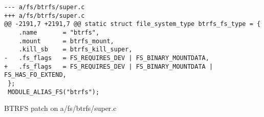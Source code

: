 \begin{listing}[h!]
\begin{verbatim}
--- a/fs/btrfs/super.c	
+++ a/fs/btrfs/super.c	
@@ -2191,7 +2191,7 @@ static struct file_system_type btrfs_fs_type = {
 	.name		= "btrfs",
 	.mount		= btrfs_mount,
 	.kill_sb	= btrfs_kill_super,
-	.fs_flags	= FS_REQUIRES_DEV | FS_BINARY_MOUNTDATA,
+	.fs_flags	= FS_REQUIRES_DEV | FS_BINARY_MOUNTDATA | FS_HAS_FO_EXTEND,
 };
 MODULE_ALIAS_FS("btrfs");
\end{verbatim}
\caption{BTRFS patch on a/fs/btrfs/super.c}
\label{listing:icbd_nameserver}
\end{listing}


